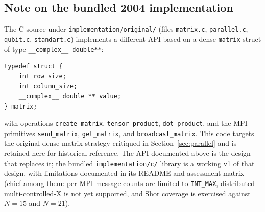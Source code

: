 \subsection{Note on the bundled 2004 implementation}

\begin{sloppypar}
The C source under \texttt{implementation/original/} (files \texttt{matrix.c}, \texttt{parallel.c}, \texttt{qubit.c}, \texttt{standart.c}) implements a different API based on a dense \verb|matrix| struct of type \verb|__complex__ double**|:
\end{sloppypar}

\begin{lstlisting}
typedef struct {
    int row_size;
    int column_size;
    __complex__ double ** value;
} matrix;
\end{lstlisting}

with operations \verb|create_matrix|, \verb|tensor_product|, \verb|dot_product|, and the MPI primitives \verb|send_matrix|, \verb|get_matrix|, and \verb|broadcast_matrix|. This code targets the original dense-matrix strategy critiqued in Section~\ref{sec:parallel} and is retained here for historical reference. The API documented above is the design that replaces it; the bundled \texttt{implementation/c/} library is a working v1 of that design, with limitations documented in its README and assessment matrix (chief among them: per-MPI-message counts are limited to \texttt{INT\_MAX}, distributed multi-controlled-X is not yet supported, and Shor coverage is exercised against $N=15$ and $N=21$).

